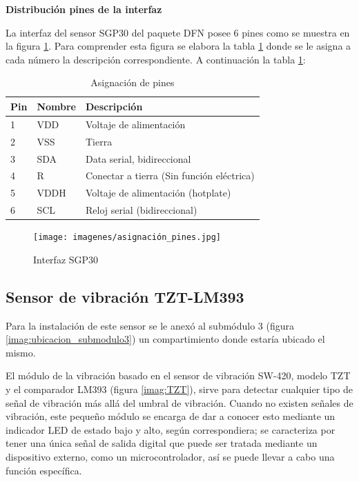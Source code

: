 \textbf{Distribución pines de la interfaz}

La interfaz del sensor SGP30 del paquete DFN posee 6 pines como se muestra en la figura \ref{imag:interfaz_sgp30}. Para comprender esta figura se elabora la tabla \ref{tab:asignacion_pines} donde se le asigna a cada número la descripción correspondiente. A continuación la tabla \ref{tab:asignacion_pines}:

\begin{table}[H]
    \centering
    \caption{Asignación de pines}
    \label{tab:asignacion_pines}
    \begin{tabular}{|l|l|l|}
    \hline
    \rowcolor[HTML]{9698ED} 
    Pin & Nombre & Descripción                               \\ \hline
    1   & VDD    & Voltaje de alimentación                   \\ \hline
    2   & VSS    & Tierra                                    \\ \hline
    3   & SDA    & Data serial, bidireccional                \\ \hline
    4   & R      & Conectar a tierra (Sin función eléctrica) \\ \hline
    5   & VDDH   & Voltaje de alimentación (hotplate)        \\ \hline
    6   & SCL    & Reloj serial (bidireccional)              \\ \hline
    \end{tabular}
\end{table}

\begin{figure}[H]
    \centering
    \texttt{[image: imagenes/asignación\_pines.jpg]}
    \caption{Interfaz SGP30}
    \label{imag:interfaz_sgp30}
 \end{figure}

\subsection{Sensor de vibración TZT-LM393}

Para la instalación de este sensor se le anexó al submódulo 3 (figura \ref{imag:ubicacion_submodulo3}) un compartimiento donde estaría ubicado el mismo.

El módulo de la vibración basado en el sensor de vibración SW-420, modelo TZT y el comparador LM393 (figura \ref{imag:TZT}), sirve para detectar cualquier tipo de señal de vibración más allá del umbral de vibración.
Cuando no existen señales de vibración, este pequeño módulo se encarga de dar a conocer esto mediante un indicador LED de estado bajo y alto, según correspondiera; se caracteriza por tener una única señal de salida digital que
puede ser tratada mediante un dispositivo externo, como un microcontrolador, así se puede llevar a cabo una función específica.\\

